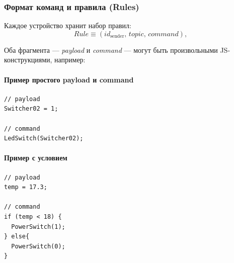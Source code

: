 \documentclass[14pt,a4paper]{extarticle}
\begin{document}
\subsubsection{Формат команд и правила (Rules)}
Каждое устройство хранит набор правил:
\[
\textit{Rule} \equiv (\mathit{id}_{\mathrm{sender}},\,\textit{topic},\,\textit{command}),
\]

Оба фрагмента — \textit{payload} и \textit{command} — могут быть произвольными JS-конструкциями, например:

\paragraph{Пример простого payload и command}
\begin{verbatim}
// payload
Switcher02 = 1;

// command
LedSwitch(Switcher02);
\end{verbatim}

\paragraph{Пример с условием}
\begin{verbatim}
// payload
temp = 17.3;

// command
if (temp < 18) {
  PowerSwitch(1);
} else{
  PowerSwitch(0);
}
\end{verbatim}




\newpage
\end{document}
